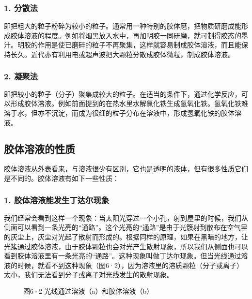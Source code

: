 \subsubsection{1. 分散法}

即把粗大的粒子粉碎为较小的粒子。通常用一种特别的胶体磨，把物质研磨成能形成胶体溶液的程度。例如将烟黑放入水中，再加明胶一同研磨，就可制得胶态的墨汁。明胶的作用是使已磨碎的粒子不再聚集，这样就容易制成胶体溶液，而且能保持长久。近代亦有利用电或超声波把大颗粒分散成胶体微粒，制成胶体溶液。

\subsubsection{2. 凝聚法}

即把较小的粒子（分子）聚集成较大的粒子。在适当的条件下，通过化学反应，可以形成胶体溶液。例如前面提到的在热水里水解氯化铁生成氢氧化铁。氢氧化铁难溶于水，但亦不沉淀，而成为很细的粒子分布在溶液中，形成氢氧化铁的胶体溶液。

\subsection{胶体溶液的性质}

胶体溶液从外表看来，与溶液很少有区别，它也是透明的液体，但有很多性质它们是不同的。胶体溶液有如下一些性质：

\subsubsection{1. 胶体溶液能发生丁达尔现象}

我们经常会看到这样一个现象：当太阳光穿过一个小孔，射到屋里的时候，我们从侧面可以看到一条光亮的``通路''。这个光亮的``通路''是由于光簇射到散布在空气里的灰尘上，灰尘对光起了散射而形成的。根据同样的原理，如果在黑暗的地方，让光簇通过胶体溶液，由于胶体颗粒也会对光产生散射现象，所以我们从侧面也可以看到胶体溶液里有一条光亮的``通路''。这种现象叫做丁达尔现象。但当光线通过溶液的时候，就看不到这种现象（图6·2），因为溶液里的溶质颗粒（分子或离子）太小，我们无法看到分子或离子对光线发生的散射现象。

\begin{figure}
\centering
\caption{图6·2 光线通过溶液（a）和胶体溶液（b）}
\end{figure}

